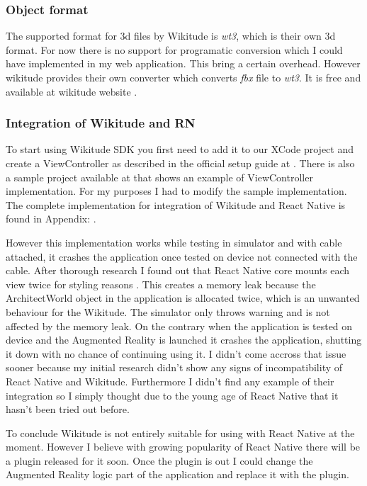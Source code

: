 \documentclass[thesis=M,english]{FITthesis}[2012/10/20]
\begin{document}
\subsubsection{Object format}

The supported format for 3d files by Wikitude is \textit{wt3}, which is their own 3d format. For now there is no support for programatic conversion which I could have implemented in my web application. This bring a certain overhead. However wikitude provides their own converter which converts \textit{fbx} file to \textit{wt3}. It is free and available at wikitude website \cite{wikitude}. 


\subsubsection{Integration of Wikitude and RN}
To start using Wikitude SDK you first need to add it to our XCode project and create a ViewController as described in the official setup guide at \cite{wikitude}. There is also a sample project available at \cite{wiki-project} that shows an example of ViewController implementation. For my purposes I had to modify the sample implementation. The complete implementation for integration of Wikitude and React Native is found in Appendix: . 

However this implementation works while testing in simulator and with cable attached, it crashes the application once tested on device not connected with the cable. After thorough research I found out that React Native core mounts each view twice for styling reasons \cite{RNcode}.
This creates a memory leak because the ArchitectWorld object in the application is allocated twice, which is an unwanted behaviour for the Wikitude. The simulator only throws warning and is not affected by the memory leak. On the contrary when the application is tested on device and the Augmented Reality is launched it crashes the application, shutting it down with no chance of continuing using it. I didn't come accross that issue sooner because my initial research didn't show any signs of incompatibility of React Native and Wikitude. Furthermore I didn't find any example of their integration so I simply thought due to the young age of React Native that it hasn't been tried out before.

To conclude Wikitude is not entirely suitable for using with React Native at the moment. However I believe with growing popularity of React Native there will be a plugin released for it soon. Once the plugin is out I could change the Augmented Reality logic part of the application and replace it with the plugin.
\end{document}
